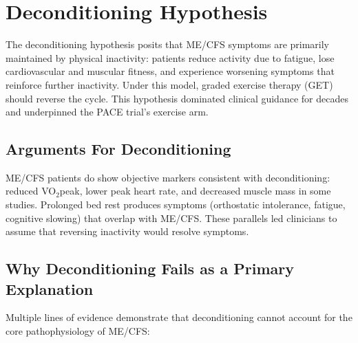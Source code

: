 \section{Deconditioning Hypothesis}
\label{sec:deconditioning-hypothesis}

The deconditioning hypothesis posits that ME/CFS symptoms are primarily maintained by physical inactivity: patients reduce activity due to fatigue, lose cardiovascular and muscular fitness, and experience worsening symptoms that reinforce further inactivity. Under this model, graded exercise therapy (GET) should reverse the cycle. This hypothesis dominated clinical guidance for decades and underpinned the PACE trial's exercise arm.

\subsection{Arguments For Deconditioning}

ME/CFS patients do show objective markers consistent with deconditioning: reduced VO$_2$peak, lower peak heart rate, and decreased muscle mass in some studies. Prolonged bed rest produces symptoms (orthostatic intolerance, fatigue, cognitive slowing) that overlap with ME/CFS. These parallels led clinicians to assume that reversing inactivity would resolve symptoms.

\subsection{Why Deconditioning Fails as a Primary Explanation}

Multiple lines of evidence demonstrate that deconditioning cannot account for the core pathophysiology of ME/CFS:

